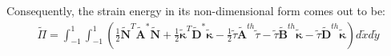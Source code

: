 \documentclass[journal]{new-aiaa}
\begin{document}
Consequently, the strain energy in its non-dimensional form comes out to be:
\begin{equation}
\label{eqn:totalennd}
\begin{aligned}
\tilde{\Pi}= \int_{-1}^{1}\int_{-1}^{1} \left(\frac{1}{2} \tilde{\bm{N}}^T\tilde{\bm{A}}^\ast\tilde{\bm{N}} + \frac{1}{2}\tilde{\bm{\kappa}}^T\tilde{\bm{D}}^\ast\tilde{\bm{\kappa}} - \frac{1}{2}\tilde{\tau}\tilde{\bm{A}}^{th}\tilde{\tau} - \tilde{\tau}\tilde{\bm{B}}^{th}\tilde{\bm{\kappa}} - \tilde{\tau}\tilde{\bm{D}}^{th}\tilde{\bm{\kappa}}\right)d\tilde{x}d\tilde{y}
\end{aligned}
\end{equation}


\end{document}
